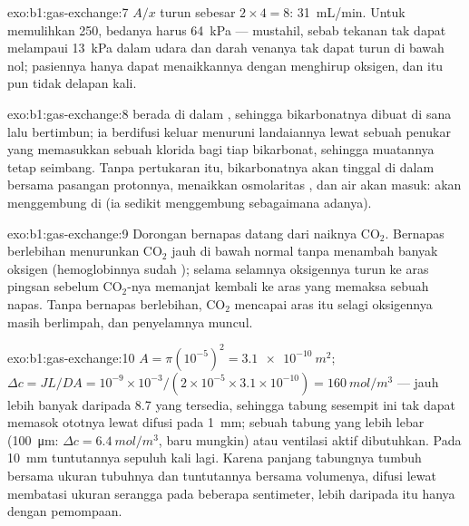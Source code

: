 \begin{solution}{exo:b1:gas-exchange:7}
$A/x$ turun sebesar $2\times 4 = 8$: \qty{31}{mL/min}. Untuk
memulihkan \qty{250}{}, bedanya harus \qty{64}{kPa} --- mustahil, sebab
tekanan  tak dapat melampaui \qty{13}{kPa} dalam udara dan
darah venanya tak dapat turun di bawah nol; pasiennya hanya dapat
menaikkannya dengan menghirup oksigen, dan itu pun tidak delapan kali.
\end{solution}

\begin{solution}{exo:b1:gas-exchange:8}
 berada di dalam , sehingga bikarbonatnya
dibuat di sana lalu bertimbun; ia berdifusi keluar menuruni landaiannya
lewat sebuah penukar yang memasukkan sebuah klorida bagi tiap
bikarbonat, sehingga muatannya tetap seimbang. Tanpa pertukaran itu,
bikarbonatnya akan tinggal di dalam bersama pasangan protonnya,
menaikkan osmolaritas , dan air akan masuk:  akan
menggembung di  (ia sedikit menggembung sebagaimana
adanya).
\end{solution}

\begin{solution}{exo:b1:gas-exchange:9}
Dorongan bernapas datang dari naiknya $\mathrm{CO_2}$. Bernapas
berlebihan menurunkan $\mathrm{CO_2}$ jauh di bawah normal tanpa
menambah banyak oksigen (hemoglobinnya sudah ); selama
selamnya oksigennya turun ke aras pingsan sebelum $\mathrm{CO_2}$-nya
memanjat kembali ke aras yang memaksa sebuah napas. Tanpa bernapas
berlebihan, $\mathrm{CO_2}$ mencapai aras itu selagi oksigennya masih
berlimpah, dan penyelamnya muncul.
\end{solution}

\begin{solution}{exo:b1:gas-exchange:10}
$A = \pi(10^{-5})^2 = \qty{3.1e-10}{m^2}$; $\Delta c = JL/DA =
10^{-9}\times 10^{-3}/(2\times 10^{-5}\times 3.1\times 10^{-10}) =
\qty{160}{mol/m^3}$ --- jauh lebih banyak daripada \qty{8.7}{} yang
tersedia, sehingga tabung sesempit ini tak dapat memasok ototnya lewat
difusi pada \qty{1}{mm}; sebuah tabung yang lebih lebar
(\qty{100}{\micro m}: $\Delta c = \qty{6.4}{mol/m^3}$, baru mungkin)
atau ventilasi aktif dibutuhkan. Pada \qty{10}{mm} tuntutannya sepuluh
kali lagi. Karena panjang tabungnya tumbuh bersama ukuran tubuhnya dan
tuntutannya bersama volumenya, difusi lewat  membatasi ukuran
serangga pada beberapa sentimeter, lebih daripada itu hanya dengan
pemompaan.
\end{solution}

